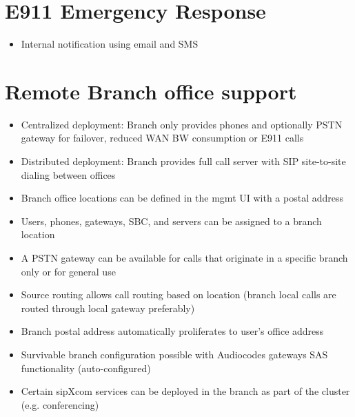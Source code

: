 \documentclass[letterpaper,10pt,english]{sphinxmanual}
\begin{document}
\section{E911 Emergency Response}
\label{\detokenize{features:e911-emergency-response}}\begin{itemize}
\item {} 
Internal notification using email and SMS

\end{itemize}


\section{Remote Branch office support}
\label{\detokenize{features:remote-branch-office-support}}\begin{itemize}
\item {} 
Centralized deployment: Branch only provides phones and optionally PSTN gateway for failover, reduced WAN BW consumption or E911 calls

\item {} 
Distributed deployment: Branch provides full call server with SIP site-to-site dialing between offices

\item {} 
Branch office locations can be defined in the mgmt UI with a postal address

\item {} 
Users, phones, gateways, SBC, and servers can be assigned to a branch location

\item {} 
A PSTN gateway can be available for calls that originate in a specific branch only or for general use

\item {} 
Source routing allows call routing based on location (branch local calls are routed through local gateway preferably)

\item {} 
Branch postal address automatically proliferates to user’s office address

\item {} 
Survivable branch configuration possible with Audiocodes gateways SAS functionality (auto-configured)

\item {} 
Certain sipXcom services can be deployed in the branch as part of the cluster (e.g. conferencing)

\end{itemize}
\end{document}
